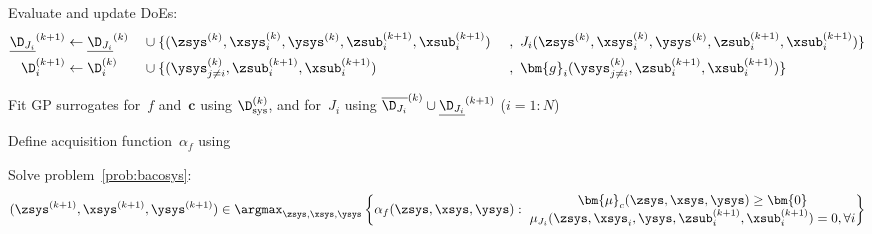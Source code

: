 \begin{algorithm}[H]
{{      Evaluate and update DoEs:\vspace{-.25cm}
      \begin{alignat*}{3}
        \underline{\D_{J_i}}^{(k+1)} &\gets
        \underline{\D_{J_i}}^{(k)} &&\cup \{
          (
            \zsys^{(k)},
            \xsys_i^{(k)},
            \ysys^{(k)},
            \zsub_i^{(k+1)},
            \xsub_i^{(k+1)}
          )&&~,~
          J_i(
            \zsys^{(k)},
            \xsys_i^{(k)},
            \ysys^{(k)},
            \zsub_i^{(k+1)},
            \xsub_i^{(k+1)}
          )
        \}\\
        \D_i^{(k+1)} &\gets \D_i^{(k)} &&\cup \{
          (
            \ysys_{j\neq i}^{(k)},
            \zsub_i^{(k+1)},
            \xsub_i^{(k+1)}
          )&&~,~
          \bm{g}_i(
            \ysys_{j\neq i}^{(k)},
            \zsub_i^{(k+1)},
            \xsub_i^{(k+1)}
          )
        \}
      \end{alignat*}\vspace{-.5cm}
    }

    \textcolor{green}{}

    Fit GP surrogates for~\(f\) and~\(\bm{c}\) using \(\D_\text{sys}^{(k)}\), and for~\(J_i\) using \(\overline{\D_{J_i}}^{(k)} \cup \underline{\D_{J_i}}^{(k+1)}\) (\(i=1:N\))

    Define acquisition function~\(\alpha_f\) using~

    Solve problem~\eqref{prob:bacosys}:\vspace{-.25cm}\textcolor{blue}{\[
        (
          \zsys^{(k+1)},
          \xsys^{(k+1)},
          \ysys^{(k+1)}
        )
        \in
        \argmax_{
          \zsys, \xsys, \ysys
        }
        \left\{
          \alpha_f(
            \zsys,
            \xsys,
            \ysys
          )
          :~
          \begin{matrix}
            \bm{\mu}_c(\zsys, \xsys, \ysys) \geq \bm{0} \\
            \mu_{J_i}(\zsys, \xsys_i, \ysys, \zsub_i^{(k+1)}, \xsub_i^{(k+1)}) = 0, \forall i
          \end{matrix}
        \right\}
    \]\vspace{-.5cm}}

}
\end{algorithm}
